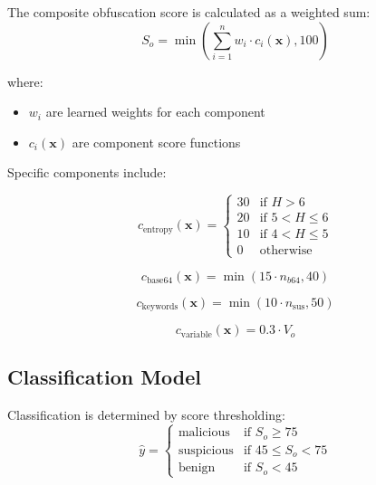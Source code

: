 \documentclass[10pt,conference,a4paper]{IEEEtran}
\begin{document}
The composite obfuscation score is calculated as a weighted sum:
\begin{equation}
S_o = \min\left(\sum_{i=1}^{n} w_i \cdot c_i(\mathbf{x}), 100\right)
\label{eq:obfscore}
\end{equation}

where:
\begin{itemize}
\item $w_i$ are learned weights for each component
\item $c_i(\mathbf{x})$ are component score functions
\end{itemize}

Specific components include:

\begin{equation}
c_{\text{entropy}}(\mathbf{x}) = \begin{cases}
30 & \text{if } H > 6 \\
20 & \text{if } 5 < H \leq 6 \\
10 & \text{if } 4 < H \leq 5 \\
0 & \text{otherwise}
\end{cases}
\end{equation}

\begin{equation}
c_{\text{base64}}(\mathbf{x}) = \min(15 \cdot n_{b64}, 40)
\end{equation}

\begin{equation}
c_{\text{keywords}}(\mathbf{x}) = \min(10 \cdot n_{\text{sus}}, 50)
\end{equation}

\begin{equation}
c_{\text{variable}}(\mathbf{x}) = 0.3 \cdot V_o
\end{equation}

\subsection{Classification Model}

Classification is determined by score thresholding:
\begin{equation}
\hat{y} = \begin{cases}
\text{malicious} & \text{if } S_o \geq 75 \\
\text{suspicious} & \text{if } 45 \leq S_o < 75 \\
\text{benign} & \text{if } S_o < 45
\end{cases}
\label{eq:classification}
\end{equation}
\end{document}
